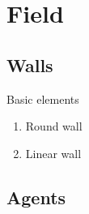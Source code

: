 \section{Field}
\subsection{Walls}
Basic elements
\begin{enumerate}
\item Round wall


\item Linear wall

\end{enumerate}


\subsection{Agents}

